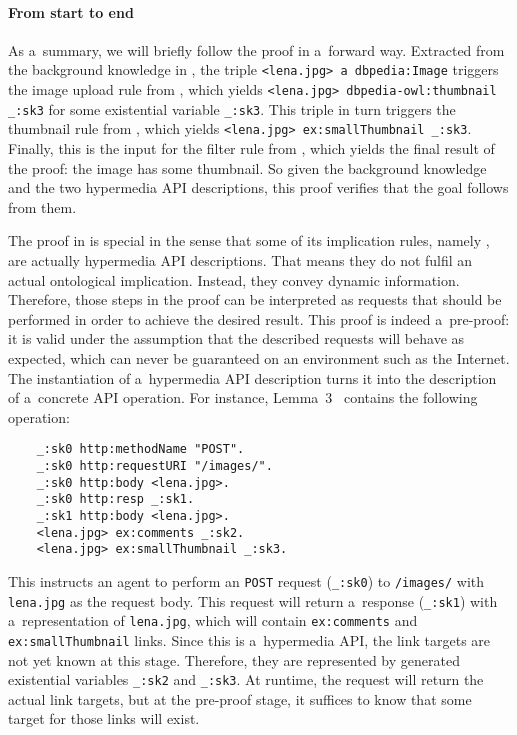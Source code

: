 \paragraph{\bfseries From start to end}
As a~summary, we will briefly follow the proof in a~forward way.
Extracted from the background knowledge in ,
the triple \verb!<lena.jpg> a dbpedia:Image!
triggers the image upload rule from ,
which yields \verb!<lena.jpg> dbpedia-owl:thumbnail _:sk3!
for some existential variable \verb!_:sk3!.
This triple in turn triggers the thumbnail rule from ,
which yields \verb!<lena.jpg> ex:smallThumbnail _:sk3!.
Finally, this is the input for the filter rule from ,
which yields the final result of the proof:
the image has some thumbnail.
So given the background knowledge
and the two hypermedia API descriptions,
this proof verifies that the goal follows from them.

The proof in  is special
in the sense that some of its implication rules,
namely ,
are actually hypermedia API descriptions.
That means they do not fulfil an actual ontological implication.
Instead, they convey dynamic information.
Therefore, those steps in the proof
can be interpreted as \http requests that should be performed
in order to achieve the desired result.
This proof is indeed a~pre-proof:
it is valid under the assumption
that the described \http requests will behave as expected,
which can never be guaranteed on an environment such as the Internet.
The instantiation of a~hypermedia API description
turns it into the description of a~concrete API operation.
For instance, Lemma~3~ contains the following operation:
\begin{Verbatim}
    _:sk0 http:methodName "POST".
    _:sk0 http:requestURI "/images/".
    _:sk0 http:body <lena.jpg>.
    _:sk0 http:resp _:sk1.
    _:sk1 http:body <lena.jpg>.
    <lena.jpg> ex:comments _:sk2.
    <lena.jpg> ex:smallThumbnail _:sk3.
\end{Verbatim}
This instructs an agent to perform
an \http \verb!POST! request (\verb!_:sk0!) to \verb!/images/!
with \verb!lena.jpg! as the request body.
This request will return a~response (\verb!_:sk1!)
with a~representation of \verb!lena.jpg!,
which will contain \verb!ex:comments! and \verb!ex:smallThumbnail! links.
Since this is a~hypermedia API,
the link targets are not yet known at this stage.
Therefore, they are represented by generated existential variables \verb!_:sk2! and \verb!_:sk3!.
At runtime, the \http request will return the actual link targets,
but at the pre-proof stage,
it suffices to know that some target for those links will exist.

